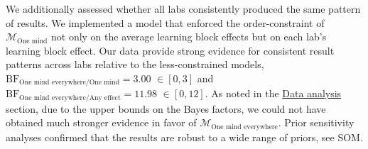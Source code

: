 \documentclass[
  man,floatsintext]{apa6}
\begin{document}
We additionally assessed whether all labs consistently produced the same pattern of results.
We implemented a model that enforced the order-constraint of \(\mathcal{M}_\textrm{One mind}\) not only on the average learning block effects but on each lab's learning block effect.
Our data provide strong evidence for consistent result patterns across labs relative to the less-constrained models, \(\mathrm{BF}_{\textrm{One mind everywhere}/\textrm{One mind}} = 3.00\) \(\in [0, 3]\) and \(\mathrm{BF}_{\textrm{One mind everywhere}/\textrm{Any effect}} = 11.98\) \(\in [0, 12]\).
As noted in the \protect\hyperlink{data-analysis1}{Data analysis} section, due to the upper bounds on the Bayes factors, we could not have obtained much stronger evidence in favor of \(\mathcal{M}_\textrm{One mind everywhere}\).
Prior sensitivity analyses confirmed that the results are robust to a wide range of priors, see SOM.
\end{document}
